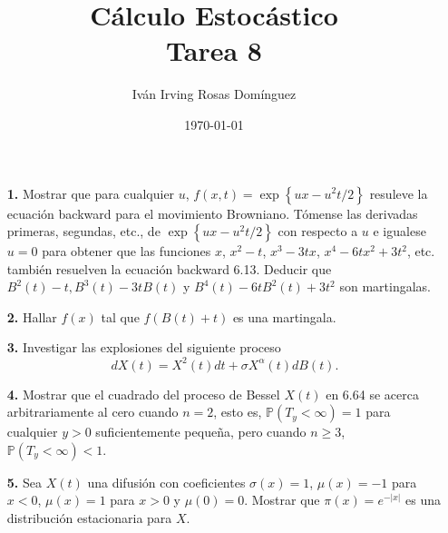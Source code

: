 \documentclass[letterpaper]{article}
\title{\textbf{Cálculo Estocástico\\
Tarea 8}}
\author{Iván Irving Rosas Domínguez}
\date{\today}
\renewcommand{\P}{\mathbb{P}}
\newcommand{\1}{\mathds{1}}
\theoremstyle{definition}
\theoremstyle{definition}
\theoremstyle{definition}
\theoremstyle{definition}
\theoremstyle{definition}
\begin{document}
\maketitle


\begin{itemize}
    \item[\textbf{1.}] Mostrar que para cualquier $u$, $f(x,t)=\exp \left\{ux-u^2t/2\right\}$ resuleve 
    la ecuación backward para el movimiento Browniano. Tómense las derivadas primeras, segundas, etc.,
    de $\exp \left\{ux-u^2t/2\right\}$ con respecto a $u$ e igualese $u=0$ para obtener que 
    las funciones $x$, $x^2-t$, $x^3-3tx$, $x^{4}-6tx^2+3t^2$, etc. también resuelven la ecuación backward 6.13.
    Deducir que $B^2(t)-t,B^3(t)-3tB(t)$ y $B^4(t)-6tB^2(t)+3t^2$ son martingalas.

    \item[\textbf{2.}] Hallar $f(x)$ tal que $f(B(t)+t)$ es una martingala.
    
    \item[\textbf{3.}] Investigar las explosiones del siguiente proceso 
    \[
        dX(t)=X^2(t)dt+\sigma X^{\alpha}(t)dB(t).  
    \]
    \item[\textbf{4.}] Mostrar que el cuadrado del proceso de Bessel $X(t)$ en 6.64 se acerca
    arbitrariamente al cero cuando $n=2$, esto es, $\P\left(T_y<\infty\right)=1$ para cualquier 
    $y>0$ suficientemente pequeña, pero cuando $n\geq3$, $\P\left(T_y<\infty\right)<1$.

    \item[\textbf{5.}] Sea $X(t)$ una difusión con coeficientes $\sigma(x)=1$, $\mu(x)=-1$ para $x<0$, 
    $\mu(x)=1$ para $x>0$ y $\mu(0)=0$. Mostrar que $\pi(x)=e^{-|x|}$ es una distribución 
    estacionaria para $X$.
\end{itemize}
\end{document}
